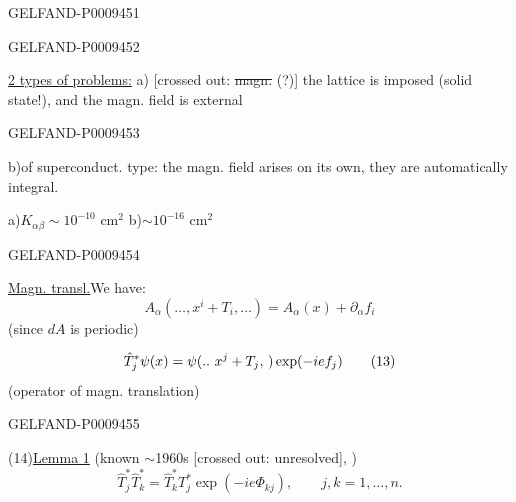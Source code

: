 \begin{GelfandAdjacentEvidence}{GELFAND-P000945}{1}

\end{GelfandAdjacentEvidence}
\begin{GelfandAdjacentEvidence}{GELFAND-P000945}{2}


\underline{2 types of problems:} a) [crossed out: \sout{magn.} (?)] the lattice is imposed (solid state!), and the magn. field is external
\end{GelfandAdjacentEvidence}
\begin{GelfandAdjacentEvidence}{GELFAND-P000945}{3}


b)\enspace of superconduct. type: the magn. field arises on its own, they are automatically integral.

a)\enspace $K_{\alpha\beta}\sim10^{-10}\text{ cm}^2$
\qquad b)\enspace $\sim10^{-16}\text{ cm}^2$
\end{GelfandAdjacentEvidence}
\begin{GelfandAdjacentEvidence}{GELFAND-P000945}{4}


\underline{Magn. transl.}\qquad We have:
\begin{equation*}
 A_\alpha(\ldots,x^i+T_i,\ldots)=A_\alpha(x)+\partial_\alpha f_i
 \tag{12}
\end{equation*}
(since $dA$ is periodic)

\begin{equation*}
 \hat T_j^*\psi(x)=\psi(\mathinner{..}\,x^{j}+T_j,\,)\exp(-ie f_j)
 \tag{13}
\end{equation*}
(operator of magn. translation)
\end{GelfandAdjacentEvidence}
\begin{GelfandAdjacentEvidence}{GELFAND-P000945}{5}


(14)\quad\underline{Lemma 1} (known $\sim$1960s
[crossed out: unresolved], )
\begin{equation*}
 \hat T_j^*\hat T_k^*=\hat T_k^*T_j^*\exp(-ie\Phi_{kj}),
 \qquad j,k=1,\ldots,n.
\end{equation*}
\end{GelfandAdjacentEvidence}
